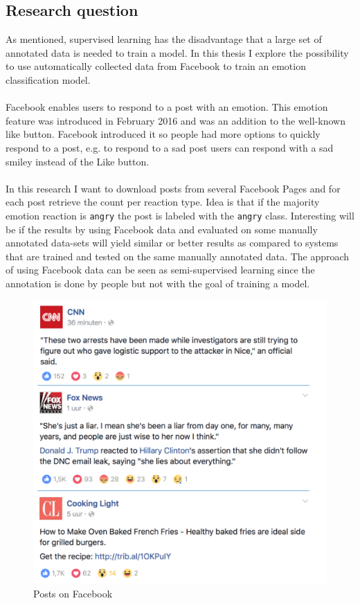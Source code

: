 \documentclass[11pt]{article}
\begin{document}
\subsection{Research question}
As mentioned, supervised learning has the disadvantage that a large set of annotated data is needed to train a model. In this thesis I explore the possibility to use automatically collected data from Facebook to train an emotion classification model.\\\\
Facebook enables users to respond to a post with an emotion. This emotion feature was introduced in February 2016 and was an addition to the well-known like button. Facebook introduced it so people had more options to quickly respond to a post, e.g. to respond to a sad post users can respond with a sad smiley instead of the Like button.\\\\
In this research I want to download posts from several Facebook Pages and for each post retrieve the count per reaction type. Idea is that if the majority emotion reaction is \texttt{angry} the post is labeled with the \texttt{angry} class. Interesting will be if the results by using Facebook data and evaluated on some manually annotated data-sets will yield similar or better results as compared to systems that are trained and tested on the same manually annotated data. The approach of using Facebook data can be seen as semi-supervised learning since the annotation is done by people but not with the goal of training a model.\\
\begin{figure}
  \includegraphics[width=\linewidth]{example_posts.png}
  \caption{Posts on Facebook}
  \label{fig:example_facebook_posts}
\end{figure}\\
\end{document}
